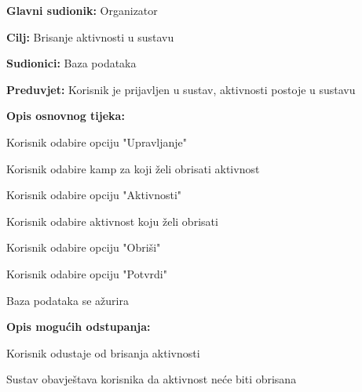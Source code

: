 					\noindent {}
					\begin{packed_item}
						
						\item \textbf{Glavni sudionik: }Organizator
						\item  \textbf{Cilj:} Brisanje aktivnosti u sustavu
						\item  \textbf{Sudionici:} Baza podataka
						\item  \textbf{Preduvjet:} Korisnik je prijavljen u sustav, aktivnosti postoje u sustavu
						\item  \textbf{Opis osnovnog tijeka:}
						
						\item[] \begin{packed_enum}
							
							\item Korisnik odabire opciju "Upravljanje"
							\item Korisnik odabire kamp za koji želi obrisati aktivnost
							\item Korisnik odabire opciju "Aktivnosti"
							\item Korisnik odabire aktivnost koju želi obrisati
							\item Korisnik odabire opciju "Obriši"
							\item Korisnik odabire opciju "Potvrdi"
							\item Baza podataka se ažurira
						\end{packed_enum}
						
						\item  \textbf{Opis mogućih odstupanja:}
						
						\item[] \begin{packed_item}
							
							\item[3.a] Korisnik odustaje od brisanja aktivnosti
							\item[] \begin{packed_enum}
								
								\item Sustav obavještava korisnika da aktivnost neće biti obrisana	
								
							\end{packed_enum}
							
							
						\end{packed_item}
					\end{packed_item}
					
